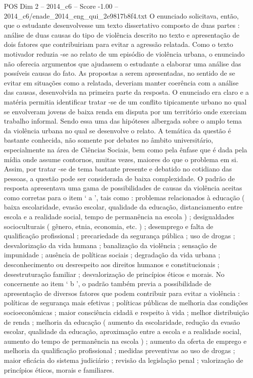 \begin{textsample}{POS Dim 2 – 2014\_c6 – Score -1.00 – 2014\_c6/enade\_2014\_eng\_qui\_2e9817b8f4.txt}
O enunciado solicitava, então, que o estudante desenvolvesse um texto dissertativo composto de duas partes : análise de duas causas do tipo de violência descrito no texto e apresentação de dois fatores que contribuiriam para evitar a agressão relatada.
Como o texto motivador reduzia -se ao relato de um episódio de violência urbana, o enunciado não oferecia argumentos que ajudassem o estudante a elaborar uma análise das possíveis causas do fato.
As propostas a serem apresentadas, no sentido de se evitar em situações como a relatada, deveriam manter coerência com a análise das causas, desenvolvida na primeira parte da resposta.
O enunciado era claro e a matéria permitia identificar tratar -se de um conflito tipicamente urbano no qual se envolveram jovens de baixa renda em disputa por um território onde exerciam trabalho informal.
Sendo essa uma das hipóteses albergada sobre o amplo tema da violência urbana no qual se desenvolve o relato.
A temática da questão é bastante conhecida, não somente por debates no âmbito universitário, especialmente na área de Ciências Sociais, bem como pela ênfase que é dada pela mídia onde assume contornos, muitas vezes, maiores do que o problema em si.
Assim, por tratar -se de tema bastante presente e debatido no cotidiano das pessoas, a questão pode ser considerada de baixa complexidade.
O padrão de resposta apresentava uma gama de possibilidades de causas da violência aceitas como corretas para o item ‘ a ’, tais como : problemas relacionados à educação ( baixa escolaridade, evasão escolar, qualidade da educação, distanciamento entre escola e a realidade social, tempo de permanência na escola ) ; desigualdades socioculturais ( gênero, etnia, economia, etc. ) ; desemprego e falta de qualificação profissional ; precariedade da segurança pública ; uso de drogas ; desvalorização da vida humana ; banalização da violência ; sensação de impunidade ; ausência de políticas sociais ; degradação da vida urbana ; desconhecimento ou desrespeito aos direitos humanos e constitucionais ; desestruturação familiar ; desvalorização de princípios éticos e morais.
No concernente ao item ‘ b ’, o padrão também previa a possibilidade de apresentação de diversos fatores que podem contribuir para evitar a violência : políticas de segurança mais efetivas ; políticas públicas de melhoria das condições socioeconômicas ; maior consciência cidadã e respeito à vida ; melhor distribuição de renda ; melhoria da educação ( aumento da escolaridade, redução da evasão escolar, qualidade da educação, aproximação entre a escola e a realidade social, aumento do tempo de permanência na escola ) ; aumento da oferta de emprego e melhoria da qualificação profissional ; medidas preventivas ao uso de drogas ; maior eficácia do sistema judiciário ; revisão da legislação penal ; valorização de princípios éticos, morais e familiares.

\end{textsample}
